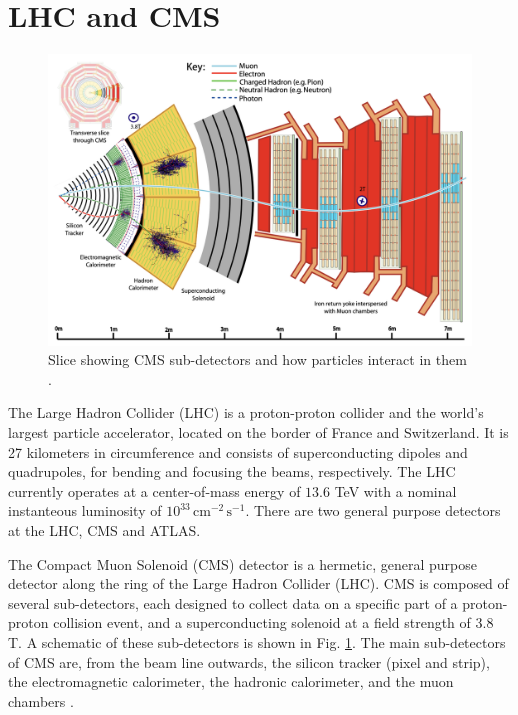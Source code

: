 \documentclass[12pt]{article}
\begin{document}
\section{LHC and CMS}
\begin{figure}
   \centering
   \includegraphics[width=0.8\linewidth]{figures/CMSslice_whiteBackground.png}
   \caption{Slice showing CMS sub-detectors and how particles interact in them \cite{particle_flow_2017}.}
   \label{fig:cms-subdetectors}
\end{figure}

The Large Hadron Collider (LHC) is a proton-proton collider and the world's largest particle accelerator, located on the border of France and Switzerland. It is 27 kilometers in circumference and consists of superconducting dipoles and quadrupoles, for bending and focusing the beams, respectively. The LHC currently operates at a center-of-mass energy of $13.6$ TeV with a nominal instanteous luminosity of $10^{33}\, \text{cm}^{-2}\, \text{s}^{-1}$. There are two general purpose detectors at the LHC, CMS and ATLAS.\par

The Compact Muon Solenoid (CMS) detector is a hermetic, general purpose detector along the ring of the Large Hadron Collider (LHC). CMS is composed of several sub-detectors, each designed to collect data on a specific part of a proton-proton collision event, and a superconducting solenoid at a field strength of $3.8$ T. A schematic of these sub-detectors is shown in Fig. \ref{fig:cms-subdetectors}. The main sub-detectors of CMS are, from the beam line outwards, the silicon tracker (pixel and strip), the electromagnetic calorimeter, the hadronic calorimeter, and the muon chambers \cite{CMS_Collaboration_2008}.\par
\end{document}
